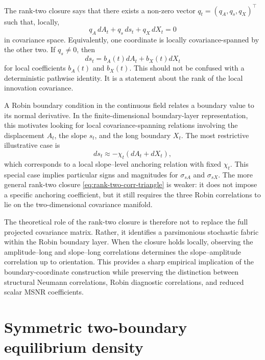 \documentclass[11pt]{article}
\numberwithin{equation}{section}
\begin{document}
The rank-two closure says that there exists a non-zero vector \(q_t=(q_A,q_s,q_X)^\top\) such that, locally,
\begin{equation}
\label{eq:rank-two-linear-relation}
        q_A\,dA_t+q_s\,ds_t+q_X\,dX_t=0
\end{equation}
in covariance space.  Equivalently, one coordinate is locally covariance-spanned by the other two.  If \(q_s\neq0\), then
\begin{equation}
\label{eq:ds-spanned-by-A-X}
        ds_t=b_A(t)dA_t+b_X(t)dX_t
\end{equation}
for local coefficients \(b_A(t)\) and \(b_X(t)\).  This should not be confused with a deterministic pathwise identity.  It is a statement about the rank of the local innovation covariance.

A Robin boundary condition in the continuous field relates a boundary value to its normal derivative.  In the finite-dimensional boundary-layer representation, this motivates looking for local covariance-spanning relations involving the displacement \(A_t\), the slope \(s_t\), and the long boundary \(X_t\).  The most restrictive illustrative case is
\begin{equation}
\label{eq:robin-slope-increment-restrictive}
        ds_t\approx -\chi_t(dA_t+dX_t),
\end{equation}
which corresponds to a local slope--level anchoring relation with fixed \(\chi_t\).  This special case implies particular signs and magnitudes for \(\sigma_{sA}\) and \(\sigma_{sX}\).  The more general rank-two closure \eqref{eq:rank-two-corr-triangle} is weaker: it does not impose a specific anchoring coefficient, but it still requires the three Robin correlations to lie on the two-dimensional covariance manifold.

The theoretical role of the rank-two closure is therefore not to replace the full projected covariance matrix.  Rather, it identifies a parsimonious stochastic fabric within the Robin boundary layer.  When the closure holds locally, observing the amplitude--long and slope--long correlations determines the slope--amplitude correlation up to orientation.  This provides a sharp empirical implication of the boundary-coordinate construction while preserving the distinction between structural Neumann correlations, Robin diagnostic correlations, and reduced scalar MSNR coefficients.


\section{Symmetric two-boundary equilibrium density}
\label{sec:symmetric-equilibrium-density}
\end{document}
